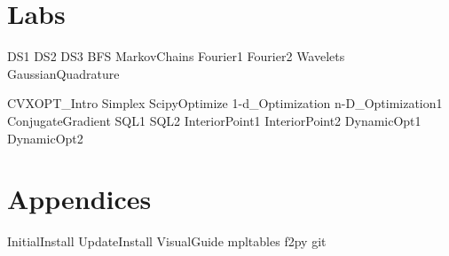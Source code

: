 \documentclass[nociteref]{SIAM-GH-book}
\begin{document}
\part{Labs} %
{DS1}
{DS2}
{DS3}
{BFS}
{MarkovChains}
{Fourier1}
{Fourier2}
{Wavelets}
{GaussianQuadrature}

{CVXOPT_Intro}
{Simplex}
{ScipyOptimize}
{1-d_Optimization}
{n-D_Optimization1}
{ConjugateGradient} %
{SQL1}
{SQL2}
{InteriorPoint1}
{InteriorPoint2}
{DynamicOpt1}
{DynamicOpt2}

\part{Appendices} %
\begin{appendices}
{InitialInstall}
{UpdateInstall}
{VisualGuide}
{mpltables}
{f2py}
{git}
\end{appendices}
\end{document}
